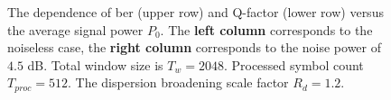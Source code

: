 \begin{figure}[tpb]
\begin{minipage}[h]{0.5\linewidth}
{    }
    \end{minipage}
    \vfill
    \begin{minipage}[h]{0.5\linewidth}
    \end{minipage}
    \hfill
    \begin{minipage}[h]{0.5\linewidth}
    \end{minipage}
    \caption{The dependence of \acrshort{ber} (upper row) and Q-factor (lower row) versus the average signal power $P_0$. The \textbf{left column} corresponds to the noiseless case, the \textbf{right column} corresponds to the noise power of $4.5$ dB. Total window size is $T_w=2048$. Processed symbol count $T_{proc} = 512$. The dispersion broadening scale factor $R_d=1.2$.}
    \label{fig:noise_all}
\end{figure}

